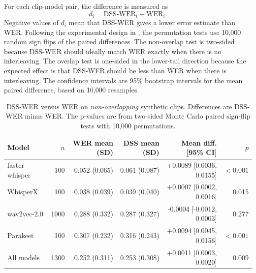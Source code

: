 For each clip-model pair, the difference is measured as
\begin{equation}
    d_i = \mathrm{DSS\text{-}WER}_i - \mathrm{WER}_i.
\end{equation}
Negative values of $d_i$ mean that DSS-WER gives a lower error estimate than WER. Following the experimental design in , the permutation tests use 10,000 random sign flips of the paired differences. The non-overlap test is two-sided because DSS-WER should ideally match WER exactly when there is no interleaving. The overlap test is one-sided in the lower-tail direction because the expected effect is that DSS-WER should be less than WER when there is interleaving. The confidence intervals are 95\% bootstrap intervals for the mean paired difference, based on 10,000 resamples.

\begin{table}[htbp]
\centering
\caption{DSS-WER versus WER on \emph{non-overlapping} synthetic clips. Differences are DSS-WER minus WER. The p-values are from two-sided Monte Carlo paired sign-flip tests with 10,000 permutations.}
\label{tab:dss_wer_non_overlap_test}
\footnotesize
\setlength{\tabcolsep}{3pt}
\begin{tabular}{lrrrrr}
\toprule
\textbf{Model} & \textbf{$n$} & \textbf{WER mean (SD)} & \textbf{DSS mean (SD)} & \textbf{Mean diff. [95\% CI]} & \textbf{$p$} \\
\midrule
faster-whisper & 100 & 0.052 (0.065) & 0.061 (0.087) & +0.0089 [0.0036, 0.0155] & $<0.001$ \\
WhisperX & 100 & 0.038 (0.039) & 0.039 (0.040) & +0.0007 [0.0002, 0.0016] & 0.015 \\
wav2vec-2.0 & 1000 & 0.288 (0.332) & 0.287 (0.327) & -0.0004 [-0.0012, 0.0003] & 0.277 \\
Parakeet & 100 & 0.307 (0.232) & 0.316 (0.243) & +0.0094 [0.0045, 0.0156] & $<0.001$ \\
All models & 1300 & 0.252 (0.311) & 0.253 (0.308) & +0.0011 [0.0003, 0.0020] & 0.009 \\
\bottomrule
\end{tabular}
\setlength{\tabcolsep}{6pt}
\normalsize
\end{table}

